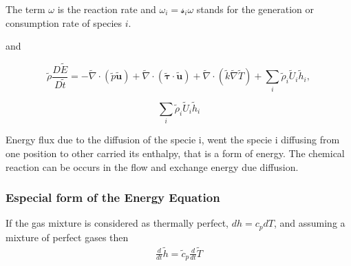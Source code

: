 \documentclass[preprint,12pt,authoryear]{elsarticle}
\begin{document}
{\color{red} The term $\omega$ is the reaction rate and 
$\omega_i = \mathcal{s}_i \omega$ stands for the generation or consumption rate of species $i$.
}


and

\begin{equation}
        \tilde{\rho}\frac{D \tilde{E} }{D \tilde{t}}
=       - 
        \tilde{\nabla} \cdot (\tilde{p} \tilde{\mathbf{u}})
        + 
        \tilde{\nabla} \cdot (\pmb{\tilde{\tau}}\cdot\tilde{\mathbf{u}}) 
        + 
        \tilde{\nabla} \cdot (\tilde{k}\tilde{\nabla} \tilde{T}) 
        + 
        \sum\limits_i \tilde{\rho}_i\tilde{U}_i\tilde{h}_i
  ,
\label{eq:E}  
\end{equation}

\begin{equation}
        \sum\limits_i \tilde{\rho}_i\tilde{U}_i\tilde{h}_i
\end{equation}

Energy flux due to the diffusion of the specie i, went 
the specie i diffusing from one position to other 
carried its enthalpy, that is a form of energy. 
The chemical reaction can be occurs in the flow 
and exchange energy  due diffusion. 



\subsubsection{Especial form of the Energy Equation}
%
If the gas mixture is considered as thermally perfect, 
$dh=c_{p}dT$, and assuming a mixture of perfect gases then 
\begin{equation}
\begin{split}
        \frac{d}{dt}\tilde{h}=\tilde{c}_p\frac{d}{dt}\tilde{T}
\end{split}
\end{equation}
\end{document}
